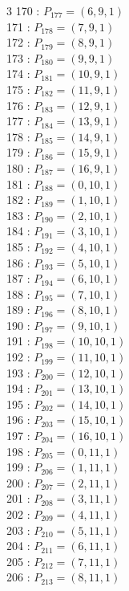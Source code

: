 \documentclass{article}
\begin{document}
{\begin{multicols}{3}
170 : $P_{177}=( 6, 9, 1 )$\\
171 : $P_{178}=( 7, 9, 1 )$\\
172 : $P_{179}=( 8, 9, 1 )$\\
173 : $P_{180}=( 9, 9, 1 )$\\
174 : $P_{181}=( 10, 9, 1 )$\\
175 : $P_{182}=( 11, 9, 1 )$\\
176 : $P_{183}=( 12, 9, 1 )$\\
177 : $P_{184}=( 13, 9, 1 )$\\
178 : $P_{185}=( 14, 9, 1 )$\\
179 : $P_{186}=( 15, 9, 1 )$\\
180 : $P_{187}=( 16, 9, 1 )$\\
181 : $P_{188}=( 0, 10, 1 )$\\
182 : $P_{189}=( 1, 10, 1 )$\\
183 : $P_{190}=( 2, 10, 1 )$\\
184 : $P_{191}=( 3, 10, 1 )$\\
185 : $P_{192}=( 4, 10, 1 )$\\
186 : $P_{193}=( 5, 10, 1 )$\\
187 : $P_{194}=( 6, 10, 1 )$\\
188 : $P_{195}=( 7, 10, 1 )$\\
189 : $P_{196}=( 8, 10, 1 )$\\
190 : $P_{197}=( 9, 10, 1 )$\\
191 : $P_{198}=( 10, 10, 1 )$\\
192 : $P_{199}=( 11, 10, 1 )$\\
193 : $P_{200}=( 12, 10, 1 )$\\
194 : $P_{201}=( 13, 10, 1 )$\\
195 : $P_{202}=( 14, 10, 1 )$\\
196 : $P_{203}=( 15, 10, 1 )$\\
197 : $P_{204}=( 16, 10, 1 )$\\
198 : $P_{205}=( 0, 11, 1 )$\\
199 : $P_{206}=( 1, 11, 1 )$\\
200 : $P_{207}=( 2, 11, 1 )$\\
201 : $P_{208}=( 3, 11, 1 )$\\
202 : $P_{209}=( 4, 11, 1 )$\\
203 : $P_{210}=( 5, 11, 1 )$\\
204 : $P_{211}=( 6, 11, 1 )$\\
205 : $P_{212}=( 7, 11, 1 )$\\
206 : $P_{213}=( 8, 11, 1 )$\\

\end{multicols}}
\end{document}
